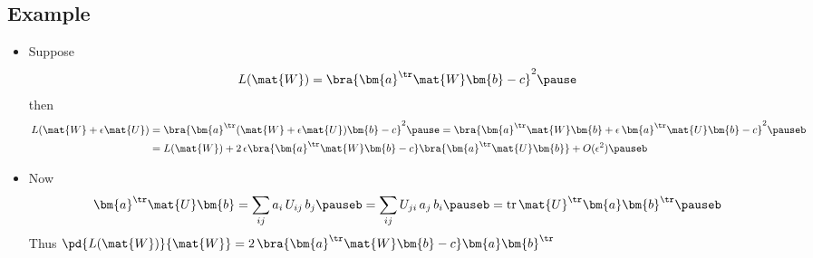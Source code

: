 \begin{slide}
\section[-1]{Example}

\begin{PauseHighLight}
  \begin{itemize}
  \item Suppose
    \begin{align*}
      L(\mat{W}) = \bra{\bm{a}^\tr \mat{W} \bm{b} - c}^2\pause
    \end{align*}
    then
    \begin{align*}
      L(\mat{W}+\epsilon \mat{U})
      &= \bra{\bm{a}^\tr (\mat{W}+\epsilon\mat{U}) \bm{b} - c}^2 \pause
        = \bra{\bm{a}^\tr \mat{W} \bm{b} + \epsilon\,
        \bm{a}^\tr \mat{U} \bm{b}  - c}^2 \pauseb \\
      &= L(\mat{W})  + 2\,\epsilon \bra{\bm{a}^\tr \mat{W} \bm{b} -
        c}\bra{ \bm{a}^\tr \mat{U} \bm{b}} + O(\epsilon^2)\pauseb
    \end{align*}
  \item Now
    \begin{align*}
      \bm{a}^\tr \mat{U} \bm{b} = \sum_{ij} a_i\, U_{ij}\, b_j \pauseb=\sum_{ij}
      U_{ji}\, a_j \, b_i \pauseb =
      \mathrm{tr}\, \mat{U}^\tr \bm{a} \bm{b}^\tr\pauseb
    \end{align*}
    Thus $\pd{L(\mat{W})}{\mat{W}} = 2\,\bra{\bm{a}^\tr \mat{W} \bm{b} -
        c}\bm{a} \bm{b}^\tr$\pauseb
  \end{itemize}
\end{PauseHighLight}

\end{slide}


